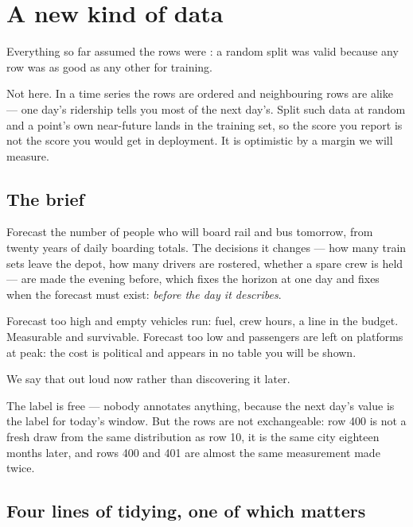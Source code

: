\documentclass[11pt,a4paper]{article}
\begin{document}

\section{A new kind of data}

Everything so far assumed the rows were : a random split was
valid because any row was as good as any other for training.

Not here. In a time series the rows are ordered and neighbouring rows are
alike --- one day's ridership tells you most of the next day's. Split such data
at random and a point's own near-future lands in the training set, so the score
you report is not the score you would get in deployment. It is optimistic by a
margin we will measure.

\subsection{The brief}

Forecast the number of people who will board rail and bus tomorrow, from twenty
years of daily boarding totals. The decisions it changes --- how many train
sets leave the depot, how many drivers are rostered, whether a spare crew is
held --- are made the evening before, which fixes the horizon at one day and
fixes when the forecast must exist: \emph{before the day it describes}.

\begin{keybox}[title={The two errors are not equal, and we choose a symmetric metric anyway}]
Forecast too high and empty vehicles run: fuel, crew hours, a line in the
budget. Measurable and survivable. Forecast too low and passengers are left on
platforms at peak: the cost is political and appears in no table you will be
shown.

We say that out loud now rather than discovering it later.
\end{keybox}

The label is free --- nobody annotates anything, because the next day's value is
the label for today's window. But the rows are not exchangeable: row 400 is not
a fresh draw from the same distribution as row 10, it is the same city eighteen
months later, and rows 400 and 401 are almost the same measurement made twice.

\subsection{Four lines of tidying, one of which matters}
\end{document}
